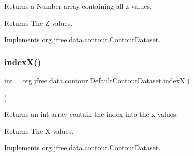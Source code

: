 Returns a Number array containing all z values.

\begin{DoxyReturn}{Returns}
The Z values. 
\end{DoxyReturn}


Implements \mbox{\hyperlink{interfaceorg_1_1jfree_1_1data_1_1contour_1_1_contour_dataset_a57f811c962e8b83f203485a177f4361f}{org.\+jfree.\+data.\+contour.\+Contour\+Dataset}}.

\mbox{\label{classorg_1_1jfree_1_1data_1_1contour_1_1_default_contour_dataset_ad34ac76cd3de6d536cd7581702c4a2d6}} 
\subsubsection{\texorpdfstring{index\+X()}{indexX()}\hspace{0.1cm}{\footnotesize\ttfamily [1/2]}}
{\footnotesize\ttfamily int \mbox{[}$\,$\mbox{]} org.\+jfree.\+data.\+contour.\+Default\+Contour\+Dataset.\+indexX (\begin{DoxyParamCaption}{ }\end{DoxyParamCaption})}

Returns an int array contain the index into the x values.

\begin{DoxyReturn}{Returns}
The X values. 
\end{DoxyReturn}


Implements \mbox{\hyperlink{interfaceorg_1_1jfree_1_1data_1_1contour_1_1_contour_dataset_ae70cc41ec60ec5aea6aae21d9d868b1f}{org.\+jfree.\+data.\+contour.\+Contour\+Dataset}}.

\mbox{\label{classorg_1_1jfree_1_1data_1_1contour_1_1_default_contour_dataset_a1e42fbe7ed58e5d5245dcc28f60c5f9b}} 
